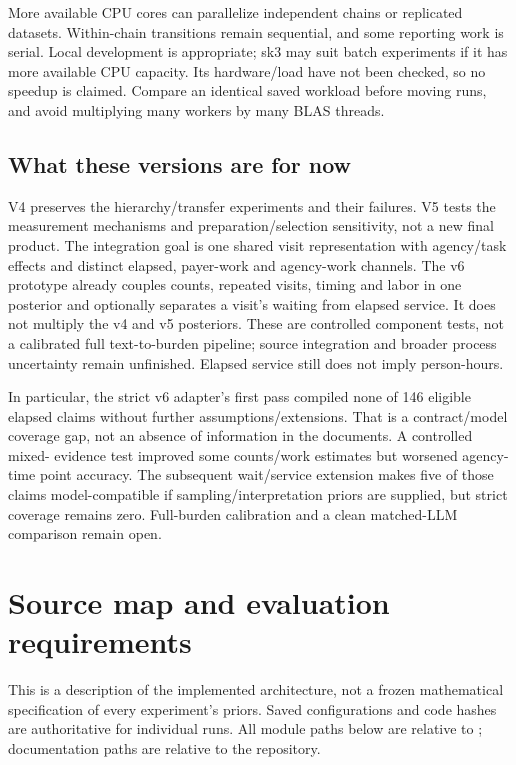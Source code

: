 \documentclass[10pt]{article}
\newcommand{\code}[1]{\texttt{\small\detokenize{#1}}}
\begin{document}
More available CPU cores can parallelize independent chains or replicated
datasets. Within-chain transitions remain sequential, and some reporting work is
serial. Local development is appropriate; sk3 may suit batch experiments if it
has more available CPU capacity. Its hardware/load have not been checked, so no
speedup is claimed. Compare an identical saved workload before moving runs, and
avoid multiplying many workers by many BLAS threads.

\subsection*{What these versions are for now}
V4 preserves the hierarchy/transfer experiments and their failures. V5 tests the
measurement mechanisms and preparation/selection sensitivity, not a new final
product. The integration goal is one shared visit representation with agency/task
effects and distinct elapsed, payer-work and agency-work channels. The v6 prototype
already couples counts, repeated visits, timing and labor in one posterior and
optionally separates a visit's waiting from elapsed service. It does not multiply
the v4 and v5 posteriors. These are controlled component tests, not a calibrated
full text-to-burden pipeline; source integration and broader process uncertainty
remain unfinished. Elapsed service still does not imply person-hours.

In particular, the strict v6 adapter's first pass compiled none of 146 eligible
elapsed claims without further assumptions/extensions. That is a contract/model
coverage gap, not an absence of information in the documents. A controlled mixed-
evidence test improved some counts/work estimates but worsened agency-time point
accuracy. The subsequent wait/service extension makes five of those claims
model-compatible if sampling/interpretation priors are supplied, but strict
coverage remains zero. Full-burden calibration and a clean matched-LLM comparison
remain open.

\clearpage
\section*{Source map and evaluation requirements}
This is a description of the implemented architecture, not a frozen mathematical
specification of every experiment's priors. Saved configurations and code hashes
are authoritative for individual runs. All module paths below are relative to
\code{pipeline/procbench/}; documentation paths are relative to the repository.
\end{document}
